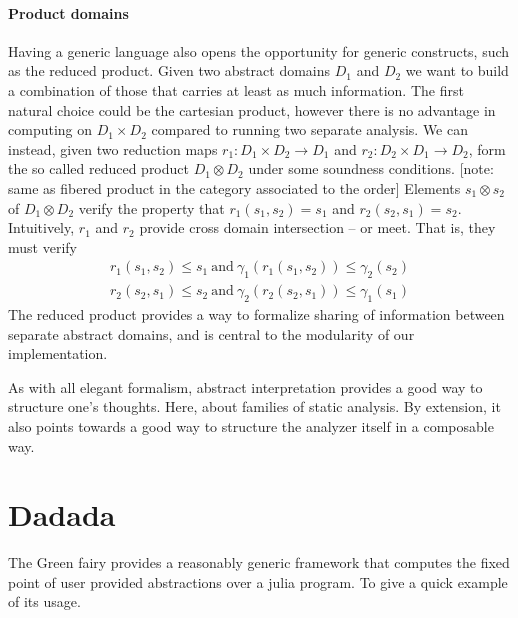 \documentclass[11pt]{article}
\begin{document}
\paragraph{Product domains} Having a generic language also opens the opportunity for generic constructs, such as the reduced product. Given two abstract domains $D_1$ and $D_2$ we want to build a combination of those that carries at least as much information. The first natural choice could be the cartesian product, however there is no advantage in computing on $D_1\times D_2$ compared to running two separate analysis. We can instead, given two reduction maps $r_1:D_1\times D_2\to D_1$ and $r_2:D_2\times D_1\to D_2$, form the so called reduced product $D_1 \otimes D_2$ under some soundness conditions. [note: same as fibered product in the category associated to the order] Elements $s_1\otimes s_2$ of $D_1 \otimes D_2$ verify the property that $r_1(s_1,s_2) = s_1$ and $r_2(s_2,s_1) = s_2$. Intuitively, $r_1$ and $r_2$ provide cross domain intersection -- or meet. That is, they must verify
\begin{align*}
r_1(s_1,s_2) \leq s_1~\text{and}~ \gamma_1(r_1(s_1,s_2)) \leq \gamma_2(s_2) \\
r_2(s_2,s_1) \leq s_2~\text{and}~ \gamma_2(r_2(s_2,s_1)) \leq \gamma_1(s_1)
\end{align*}
The reduced product provides a way to formalize sharing of information between separate abstract domains, and is central to the modularity of our implementation.


As with all elegant formalism, abstract interpretation provides a good way to structure one's thoughts. Here, about families of static analysis. By extension, it also points towards a good way to structure the analyzer itself in a composable way.

\section*{Dadada}

The Green fairy provides a reasonably generic framework that computes the fixed point of user provided abstractions over a julia program. To give a quick example of its usage.
\end{document}

